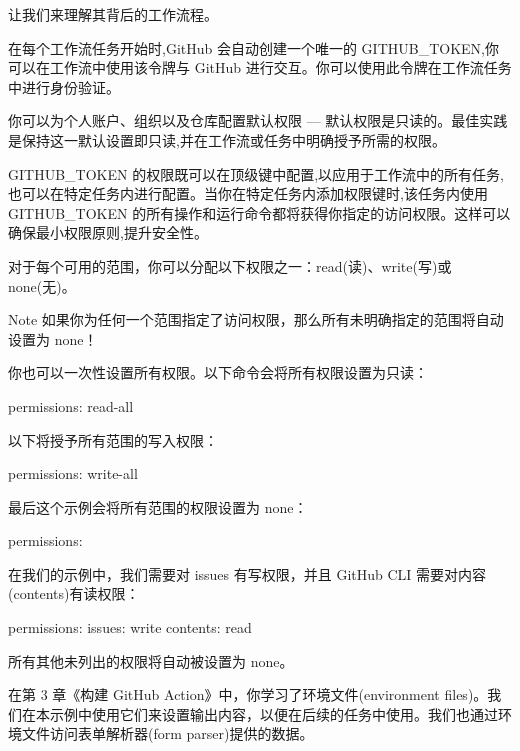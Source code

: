 让我们来理解其背后的工作流程。


在每个工作流任务开始时,GitHub 会自动创建一个唯一的 GITHUB\_TOKEN,你可以在工作流中使用该令牌与 GitHub 进行交互。你可以使用此令牌在工作流任务中进行身份验证。

你可以为个人账户、组织以及仓库配置默认权限 --- 默认权限是只读的。最佳实践是保持这一默认设置即只读,并在工作流或任务中明确授予所需的权限。

GITHUB\_TOKEN 的权限既可以在顶级键中配置,以应用于工作流中的所有任务,也可以在特定任务内进行配置。当你在特定任务内添加权限键时,该任务内使用 GITHUB\_TOKEN 的所有操作和运行命令都将获得你指定的访问权限。这样可以确保最小权限原则,提升安全性。

对于每个可用的范围，你可以分配以下权限之一：read(读)、write(写)或 none(无)。

\begin{myNotic}{Note}
如果你为任何一个范围指定了访问权限，那么所有未明确指定的范围将自动设置为 none！
\end{myNotic}

你也可以一次性设置所有权限。以下命令会将所有权限设置为只读：

\begin{shell}
permissions: read-all
\end{shell}

以下将授予所有范围的写入权限：

\begin{shell}
permissions: write-all
\end{shell}

最后这个示例会将所有范围的权限设置为 none：

\begin{shell}
permissions: {}
\end{shell}

在我们的示例中，我们需要对 issues 有写权限，并且 GitHub CLI 需要对内容(contents)有读权限：

\begin{shell}
permissions:
  issues: write
  contents: read
\end{shell}

所有其他未列出的权限将自动被设置为 none。


在第 3 章《构建 GitHub Action》中，你学习了环境文件(environment files)。我们在本示例中使用它们来设置输出内容，以便在后续的任务中使用。我们也通过环境文件访问表单解析器(form parser)提供的数据。

